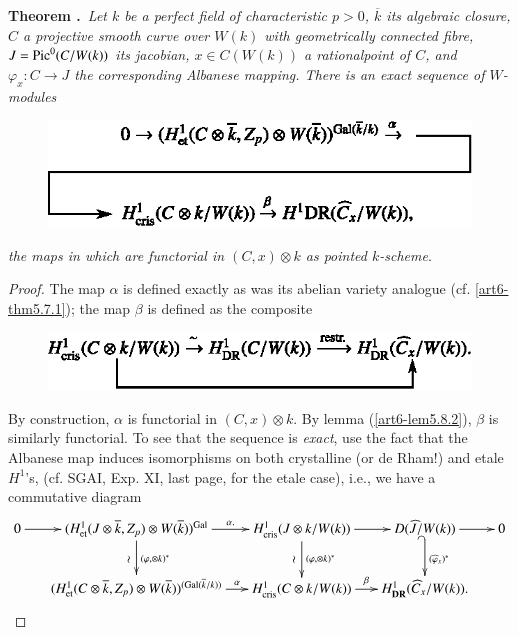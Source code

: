 \medskip
\noindent
{\bf Theorem .\label{art6-thm5.9.5}}~{\em Let $k$ be a perfect field of characteristic $p>0$, $\overline{k}$ its algebraic closure, $C$ a projective smooth curve over $W(k)$ with geometrically connected fibre, $J=\operatorname{Pic}^{0}(C/W(k))$ its jacobian, $x\in C(W(k))$ a rational\pageoriginale point of $C$, and $\varphi_{x}:C\to J$ the corresponding Albanese mapping. There is an exact sequence of $W$-modules}
\begin{figure}[H]
\centering
\includegraphics{chap6/fig14.eps}
\end{figure}
{\em the maps in which are functorial in $(C,x)\otimes k$ as pointed $k$-scheme}.

\begin{proof}
The map $\alpha$ is defined exactly as was its abelian variety analogue (cf. \ref{art6-thm5.7.1}); the map $\beta$ is defined as the composite
\begin{figure}[H]
\centering
\includegraphics{chap6/fig15.eps}
\end{figure}
By construction, $\alpha$ is functorial in $(C,x)\otimes k$. By lemma (\ref{art6-lem5.8.2}), $\beta$ is similarly functorial. To see that the sequence is {\em exact}, use the fact that the Albanese map induces isomorphisms on both crystalline (or de Rham!) and etale $H^{1}$'s, (cf. SGAI, Exp. XI, last page, for the etale case), i.e., we have a commutative diagram
{\fontsize{8}{10}\selectfont
\[
\xymatrix@C=.55cm{
0\ar[r] & (H^{1}_{\et}(J\otimes \overline{k},Z_{p})\otimes W(\overline{k}))^{\Gal}\ar[d]_{\rotatebox{90}{$\sim$}}^{(\varphi,\otimes k)^{*}}\ar[r]^-{\alpha.} & H^{1}_{\cris}(J\otimes k/W(k)) \ar[d]_{\rotatebox{90}{$\sim$}}^{(\varphi,\otimes k)^{*}}\ar[r] & D(\widehat{J}/W(k))\ar@{_(->}[d]^{(\widehat{\varphi}_{x})^{*}}\ar[r] & 0\\
 & (H^{1}_{\et}(C\otimes \overline{k},Z_{p})\otimes W(\overline{k}))^{(\Gal(\overline{k}/k))}\ar[r]^-{\alpha} & H^{1}_{\cris}(C\otimes k/W(k))\ar[r]^-{\beta} & H^{1}_{\DR}(\widehat{C}_{x}/W(k)). & 
}
\]}\relax
\end{proof}

